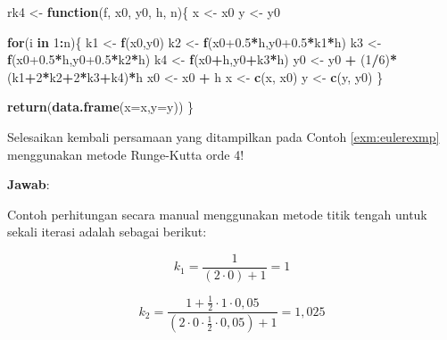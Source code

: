\documentclass[]{book}
\newenvironment{Shaded}{\begin{snugshade}}{\end{snugshade}}
\newcommand{\ControlFlowTok}[1]{\textcolor[rgb]{0.13,0.29,0.53}{\textbf{#1}}}
\newcommand{\DataTypeTok}[1]{\textcolor[rgb]{0.13,0.29,0.53}{#1}}
\newcommand{\DecValTok}[1]{\textcolor[rgb]{0.00,0.00,0.81}{#1}}
\newcommand{\FloatTok}[1]{\textcolor[rgb]{0.00,0.00,0.81}{#1}}
\newcommand{\KeywordTok}[1]{\textcolor[rgb]{0.13,0.29,0.53}{\textbf{#1}}}
\newcommand{\NormalTok}[1]{#1}
\newcommand{\OperatorTok}[1]{\textcolor[rgb]{0.81,0.36,0.00}{\textbf{#1}}}
\newcommand{\StringTok}[1]{\textcolor[rgb]{0.31,0.60,0.02}{#1}}
\theoremstyle{definition}
\theoremstyle{definition}
\theoremstyle{definition}
\theoremstyle{remark}
\let\BeginKnitrBlock\begin \let\EndKnitrBlock\end
\begin{document}
\begin{Shaded}
\begin{Highlighting}[]
\NormalTok{rk4 <-}\StringTok{ }\ControlFlowTok{function}\NormalTok{(f, x0, y0, h, n)\{}
\NormalTok{  x <-}\StringTok{ }\NormalTok{x0}
\NormalTok{  y <-}\StringTok{ }\NormalTok{y0}
  
  \ControlFlowTok{for}\NormalTok{(i }\ControlFlowTok{in} \DecValTok{1}\OperatorTok{:}\NormalTok{n)\{}
\NormalTok{    k1 <-}\StringTok{ }\KeywordTok{f}\NormalTok{(x0,y0)}
\NormalTok{    k2 <-}\StringTok{ }\KeywordTok{f}\NormalTok{(x0}\FloatTok{+0.5}\OperatorTok{*}\NormalTok{h,y0}\FloatTok{+0.5}\OperatorTok{*}\NormalTok{k1}\OperatorTok{*}\NormalTok{h)}
\NormalTok{    k3 <-}\StringTok{ }\KeywordTok{f}\NormalTok{(x0}\FloatTok{+0.5}\OperatorTok{*}\NormalTok{h,y0}\FloatTok{+0.5}\OperatorTok{*}\NormalTok{k2}\OperatorTok{*}\NormalTok{h)}
\NormalTok{    k4 <-}\StringTok{ }\KeywordTok{f}\NormalTok{(x0}\OperatorTok{+}\NormalTok{h,y0}\OperatorTok{+}\NormalTok{k3}\OperatorTok{*}\NormalTok{h)}
\NormalTok{    y0 <-}\StringTok{ }\NormalTok{y0 }\OperatorTok{+}\StringTok{ }\NormalTok{(}\DecValTok{1}\OperatorTok{/}\DecValTok{6}\NormalTok{)}\OperatorTok{*}\NormalTok{(k1}\OperatorTok{+}\DecValTok{2}\OperatorTok{*}\NormalTok{k2}\OperatorTok{+}\DecValTok{2}\OperatorTok{*}\NormalTok{k3}\OperatorTok{+}\NormalTok{k4)}\OperatorTok{*}\NormalTok{h}
\NormalTok{    x0 <-}\StringTok{ }\NormalTok{x0 }\OperatorTok{+}\StringTok{ }\NormalTok{h}
\NormalTok{    x <-}\StringTok{ }\KeywordTok{c}\NormalTok{(x, x0)}
\NormalTok{    y <-}\StringTok{ }\KeywordTok{c}\NormalTok{(y, y0)}
\NormalTok{  \}}
  
  \KeywordTok{return}\NormalTok{(}\KeywordTok{data.frame}\NormalTok{(}\DataTypeTok{x=}\NormalTok{x,}\DataTypeTok{y=}\NormalTok{y))}
\NormalTok{\}}
\end{Highlighting}
\end{Shaded}

\BeginKnitrBlock{example}
\protect\hypertarget{exm:rkexmp}{}{\label{exm:rkexmp} }Selesaikan kembali persamaan yang ditampilkan pada Contoh \ref{exm:eulerexmp} menggunakan metode Runge-Kutta orde 4!
\EndKnitrBlock{example}

\textbf{Jawab}:

Contoh perhitungan secara manual menggunakan metode titik tengah untuk sekali iterasi adalah sebagai berikut:

\[
k_1=\frac{1}{\left(2\cdot 0\right)+1}=1
\]

\[
k_2=\frac{1+\frac{1}{2}\cdot1\cdot0,05}{\left(2\cdot 0\cdot\frac{1}{2}\cdot0,05\right)+1}=1,025
\]
\end{document}
